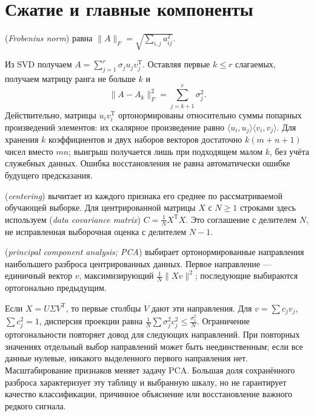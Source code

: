 \section{Сжатие и главные компоненты}
\begin{definition} (\emph{Frobenius norm}) равна \(\|A\|_F=\sqrt{\sum_{i,j}a_{ij}^2}\).\end{definition}
Из SVD получаем \(A=\sum_{j=1}^r\sigma_j u_jv_j^{\mathrm T}\). Оставляя первые \(k\le r\) слагаемых, получаем матрицу ранга не больше \(k\) и
\[\|A-A_k\|_F^2=\sum_{j=k+1}^r\sigma_j^2.\]
Действительно, матрицы \(u_iv_i^{\mathrm T}\) ортонормированы относительно суммы попарных произведений элементов: их скалярное произведение равно \(\langle u_i,u_j\rangle\langle v_i,v_j\rangle\). Для хранения \(k\) коэффициентов и двух наборов векторов достаточно \(k(m+n+1)\) чисел вместо \(mn\); выигрыш получается лишь при подходящем малом \(k\), без учёта служебных данных. Ошибка восстановления не равна автоматически ошибке будущего предсказания.
\begin{definition} (\emph{centering}) вычитает из каждого признака его среднее по рассматриваемой обучающей выборке. Для центрированной матрицы \(X\) с \(N\ge1\) строками здесь используем  (\emph{data covariance matrix}) \(C=\frac1N X^{\mathrm T}X\). Это соглашение с делителем \(N\), не исправленная выборочная оценка с делителем \(N-1\).\end{definition}
\begin{definition} (\emph{principal component analysis; PCA}) выбирает ортонормированные направления наибольшего разброса центрированных данных. Первое направление --- единичный вектор \(v\), максимизирующий \(\frac1N\|Xv\|^2\); последующие выбираются ортогонально предыдущим.\end{definition}
Если \(X=U\Sigma V^{\mathrm T}\), то первые столбцы \(V\) дают эти направления. Для \(v=\sum c_jv_j\), \(\sum c_j^2=1\), дисперсия проекции равна \(\frac1N\sum \sigma_j^2c_j^2\le\frac{\sigma_1^2}{N}\). Ограничение ортогональности повторяет довод для следующих направлений. При повторных значениях отдельный выбор направлений может быть неединственным; если все данные нулевые, никакого выделенного первого направления нет. Масштабирование признаков меняет задачу PCA. Большая доля сохранённого разброса характеризует эту таблицу и выбранную шкалу, но не гарантирует качество классификации, причинное объяснение или восстановление важного редкого сигнала.

